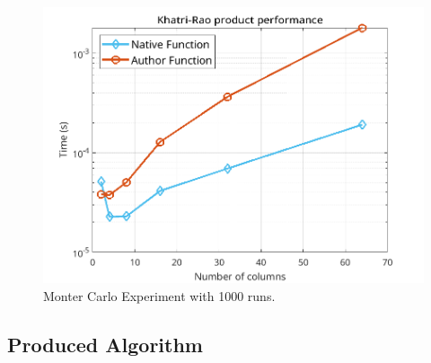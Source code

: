 \documentclass[a4paper,10pt]{article}
\begin{document}
    \begin{figure}[ht!]
        \centering 
        \includegraphics[width=0.65\linewidth]{figs/hw1a3.png} \par 
        \caption{Monter Carlo Experiment with 1000 runs.}
        \label{fig:hw1a3} 
    \end{figure}

    \newpage
    \subsection*{Produced Algorithm}
\end{document}
